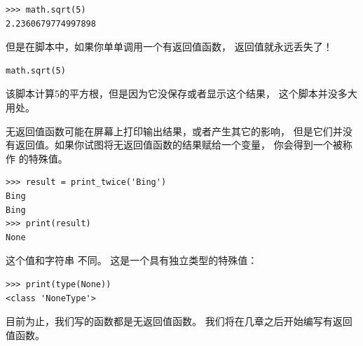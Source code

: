 \begin{lstlisting}
>>> math.sqrt(5)
2.2360679774997898
\end{lstlisting}

%

但是在脚本中，如果你单单调用一个有返回值函数， 返回值就永远丢失了！

\begin{lstlisting}
math.sqrt(5)
\end{lstlisting}

%

该脚本计算5的平方根，但是因为它没保存或者显示这个结果，
这个脚本并没多大用处。
  


无返回值函数可能在屏幕上打印输出结果，或者产生其它的影响，
但是它们并没有返回值。如果你试图将无返回值函数的结果赋给一个变量，
你会得到一个被称作  的特殊值。
  

\begin{lstlisting}
>>> result = print_twice('Bing')
Bing
Bing
>>> print(result)
None
\end{lstlisting}

%

 这个值和字符串  不同。 这是一个具有独立类型的特殊值：

\begin{lstlisting}
>>> print(type(None))
<class 'NoneType'>
\end{lstlisting}

%

目前为止，我们写的函数都是无返回值函数。
我们将在几章之后开始编写有返回值函数。
  


%
